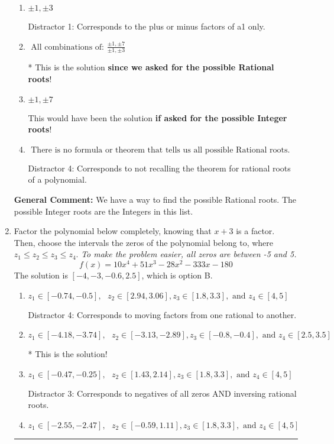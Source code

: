 \documentclass{extbook}[14pt]
\newcommand{\litem}[1]{\item #1

\rule{\textwidth}{0.4pt}}
\begin{document}
\begin{enumerate}
{\begin{enumerate}[label=\Alph*.]
 Distractor 3: Corresponds to the plus or minus of the inverse quotient (an/a0) of the factors. 
\item \( \pm 1,\pm 3 \)

 Distractor 1: Corresponds to the plus or minus factors of a1 only.
\item \( \text{ All combinations of: }\frac{\pm 1,\pm 7}{\pm 1,\pm 3} \)

* This is the solution \textbf{since we asked for the possible Rational roots}!
\item \( \pm 1,\pm 7 \)

This would have been the solution \textbf{if asked for the possible Integer roots}!
\item \( \text{ There is no formula or theorem that tells us all possible Rational roots.} \)

 Distractor 4: Corresponds to not recalling the theorem for rational roots of a polynomial.
\end{enumerate}

\textbf{General Comment:} We have a way to find the possible Rational roots. The possible Integer roots are the Integers in this list.
}
\litem{
Factor the polynomial below completely, knowing that $x + 3$ is a factor. Then, choose the intervals the zeros of the polynomial belong to, where $z_1 \leq z_2 \leq z_3 \leq z_4$. \textit{To make the problem easier, all zeros are between -5 and 5.}
\[ f(x) = 10x^{4} +51 x^{3} -28 x^{2} -333 x -180 \]The solution is \( [-4, -3, -0.6, 2.5] \), which is option B.\begin{enumerate}[label=\Alph*.]
\item \( z_1 \in [-0.74, -0.5], \text{   }  z_2 \in [2.94, 3.06], z_3 \in [1.8, 3.3], \text{   and   } z_4 \in [4, 5] \)

 Distractor 4: Corresponds to moving factors from one rational to another.
\item \( z_1 \in [-4.18, -3.74], \text{   }  z_2 \in [-3.13, -2.89], z_3 \in [-0.8, -0.4], \text{   and   } z_4 \in [2.5, 3.5] \)

* This is the solution!
\item \( z_1 \in [-0.47, -0.25], \text{   }  z_2 \in [1.43, 2.14], z_3 \in [1.8, 3.3], \text{   and   } z_4 \in [4, 5] \)

 Distractor 3: Corresponds to negatives of all zeros AND inversing rational roots.
\item \( z_1 \in [-2.55, -2.47], \text{   }  z_2 \in [-0.59, 1.11], z_3 \in [1.8, 3.3], \text{   and   } z_4 \in [4, 5] \)


\end{enumerate}}
\end{enumerate}
\end{document}

